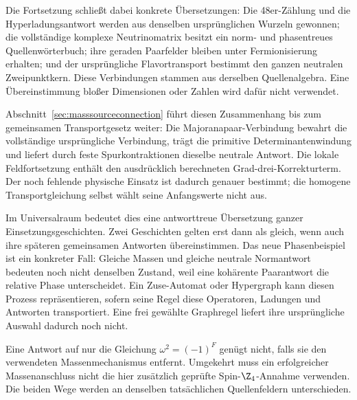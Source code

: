 Die Fortsetzung schließt dabei konkrete Übersetzungen: Die 48er-Zählung und
die Hyperladungsantwort werden aus denselben ursprünglichen Wurzeln gewonnen;
die vollständige komplexe Neutrinomatrix besitzt ein norm- und phasentreues
Quellenwörterbuch; ihre geraden Paarfelder bleiben unter Fermionisierung erhalten;
und der ursprüngliche Flavortransport bestimmt den ganzen neutralen
Zweipunktkern. Diese Verbindungen stammen aus derselben Quellenalgebra.
Eine Übereinstimmung bloßer Dimensionen oder Zahlen wird dafür nicht verwendet.

Abschnitt~\ref{sec:masssourceconnection} führt diesen Zusammenhang bis zum
gemeinsamen Transportgesetz weiter: Die Majoranapaar-Verbindung bewahrt die
vollständige ursprüngliche Verbindung, trägt die primitive
Determinantenwindung und liefert durch feste Spurkontraktionen dieselbe
neutrale Antwort. Die lokale Feldfortsetzung enthält den ausdrücklich
berechneten Grad-drei-Korrekturterm. Der noch fehlende physische Einsatz
ist dadurch genauer bestimmt; die homogene Transportgleichung selbst
wählt seine Anfangswerte nicht aus.


Im Universalraum bedeutet dies eine antworttreue Übersetzung ganzer
Einsetzungsgeschichten. Zwei Geschichten gelten erst dann als gleich,
wenn auch ihre späteren gemeinsamen Antworten übereinstimmen.
Das neue Phasenbeispiel ist ein konkreter Fall: Gleiche Massen und gleiche
neutrale Normantwort bedeuten noch nicht denselben Zustand, weil eine
kohärente Paarantwort die relative Phase unterscheidet. Ein Zuse-Automat
oder Hypergraph kann diesen Prozess repräsentieren, sofern seine Regel
diese Operatoren, Ladungen und Antworten transportiert. Eine frei gewählte
Graphregel liefert ihre ursprüngliche Auswahl dadurch noch nicht.

Eine Antwort auf nur die Gleichung $\omega^2=(-1)^F$ genügt nicht, falls sie den verwendeten Massenmechanismus entfernt. Umgekehrt muss ein erfolgreicher Massenanschluss nicht die hier zusätzlich geprüfte Spin-$\Z_4$-Annahme verwenden. Die beiden Wege werden an denselben tatsächlichen Quellenfeldern unterschieden.

